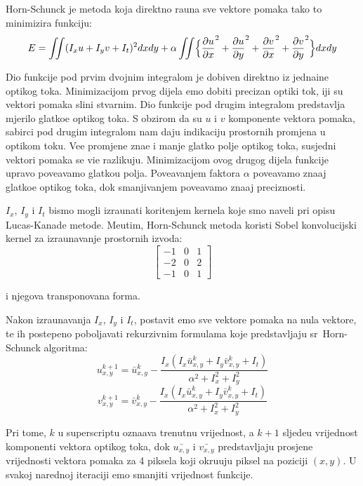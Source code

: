 Horn-Schunck je metoda koja direktno ra\ch una sve vektore pomaka tako \sh to minimizira funkciju\cite{matlabhs}:
\[
E=\iint(I_xu+I_yv+I_t)^2dxdy+\alpha \iint\Bigl\{\frac{\partial u}{\partial x}^2+\frac{\partial u}{\partial y}^2+\frac{\partial v}{\partial x}^2+\frac{\partial v}{\partial y}^2\Bigr\}dxdy
\]

Dio funkcije pod prvim dvojnim integralom je dobiven direktno iz jedna\ch ine opti\ch kog toka. Minimizacijom prvog dijela \cj emo dobiti precizan opti\ch ki tok,
\ch iji su vektori pomaka sli\ch ni stvarnim. Dio funkcije pod drugim integralom predstavlja mjerilo glatko\cj e opti\ch kog toka. S obzirom da su $u$ i $v$ komponente
vektora pomaka, sabirci pod drugim integralom nam daju indikaciju prostornih promjena u opti\ch kom toku. Ve\cj e promjene zna\ch e i manje glatko polje
opti\ch kog toka, susjedni vektori pomaka se vi\sh e razlikuju. Minimizacijom ovog drugog dijela funkcije upravo pove\cj avamo glatko\cj u polja. Pove\cj avanjem
faktora $\alpha$ pove\cj avamo zna\ch aj glatko\cj e opti\ch kog toka, dok smanjivanjem pove\cj avamo zna\ch aj preciznosti.

$I_x$, $I_y$ i $I_t$ bismo mogli izra\ch unati kori\sh tenjem kernela koje smo naveli pri opisu Lucas-Kanade metode. Me\dj utim, Horn-Schunck metoda koristi
Sobel konvolucijski kernel za izra\ch unavanje prostornih izvoda:
\[
\begin{bmatrix}
-1 & 0 & 1 \\
-2 & 0 & 2 \\
-1 & 0 & 1
\end{bmatrix}
\]

i njegova transponovana forma. 

Nakon izra\ch unavanja $I_x$, $I_y$ i $I_t$, postavit \cj emo sve vektore pomaka na nula vektore, te ih postepeno pobolj\sh avati rekurzivnim formulama
koje predstavljaju sr\zh\ Horn-Schunck algoritma:
\[
u_{x,y}^{k+1}=\bar{u}_{x,y}^{k}-\frac{I_x(I_x\bar{u}_{x,y}^{k}+I_y\bar{v}_{x,y}^{k}+I_t)}{\alpha^2+I_x^2+I_y^2}
\]
\[
v_{x,y}^{k+1}=\bar{v}_{x,y}^{k}-\frac{I_x(I_x\bar{u}_{x,y}^{k}+I_y\bar{v}_{x,y}^{k}+I_t)}{\alpha^2+I_x^2+I_y^2}
\]

Pri tome, $k$ u superscriptu ozna\ch ava trenutnu vrijednost, a $k+1$ sljede\cj u vrijednost komponenti vektora opti\ch kog toka, dok $\bar{u_{x,y}}$ i $\bar{v_{x,y}}$
predstavljaju prosje\ch ne vrijednosti vektora pomaka za 4 piksela koji okru\zh uju piksel na poziciji $(x,y)$. U svakoj narednoj iteraciji \cj emo smanjiti vrijednost
funkcije.